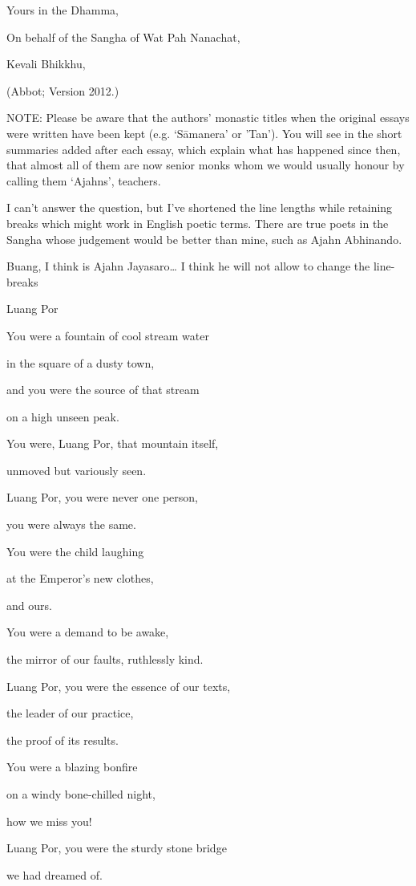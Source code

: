 Yours in the Dhamma,

On behalf of the Sangha of Wat Pah Nanachat,

Kevali Bhikkhu,

(Abbot; Version 2012.)

NOTE: Please be aware that the authors' monastic titles when the
original essays were written have been kept (e.g. `Sāmanera' or 'Tan').
You will see in the short summaries added after each essay, which
explain what has happened since then, that almost all of them are now
senior monks whom we would usually honour by calling them `Ajahns',
teachers.

I can't answer the question, but I've shortened the line lengths while
retaining breaks which might work in English poetic terms. There are
true poets in the Sangha whose judgement would be better than mine, such
as Ajahn Abhinando.

Buang, I think is Ajahn Jayasaro\ldots{} I think he will not allow to
change the line-breaks

Luang Por

You were a fountain of cool stream water

in the square of a dusty town,

and you were the source of that stream

on a high unseen peak.

You were, Luang Por, that mountain itself,

unmoved but variously seen.

Luang Por, you were never one person,

you were always the same.

You were the child laughing

at the Emperor's new clothes,

and ours.

You were a demand to be awake,

the mirror of our faults, ruthlessly kind.

Luang Por, you were the essence of our texts,

the leader of our practice,

the proof of its results.

You were a blazing bonfire

on a windy bone-chilled night,

how we miss you!

Luang Por, you were the sturdy stone bridge

we had dreamed of.

